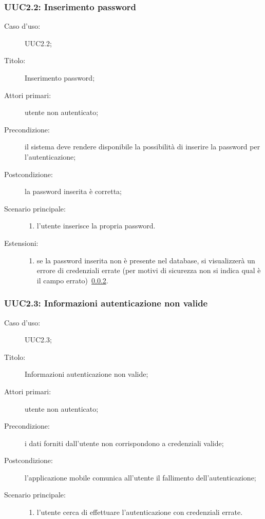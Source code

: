 \documentclass[../../../analisi-dei-requisiti.tex]{subfiles}
\begin{document}
\subsubsection{UUC2.2: Inserimento password}%
\label{subs:UUC2.2}
\begin{description}
  \item[Caso d’uso:] UUC2.2;
  \item[Titolo:] Inserimento password;
  \item[Attori primari:] utente non autenticato;
  \item[Precondizione:] il sistema deve rendere disponibile la possibilità di inserire la password per l'autenticazione;
  \item[Postcondizione:] la password inserita è corretta;
  \item[Scenario principale:]
  \begin{enumerate}
    \item l'utente inserisce la propria password.
  \end{enumerate}
  \item[Estensioni:]
  \begin{enumerate}
    \item se la password inserita non è presente nel database, si visualizzerà un errore di credenziali errate (per motivi di sicurezza non si indica qual è il campo errato)~\ref{subs:UUC2.3}.
  \end{enumerate}
\end{description}



\subsubsection{UUC2.3: Informazioni autenticazione non valide}%
\label{subs:UUC2.3}
\begin{description}
  \item[Caso d’uso:] UUC2.3;
  \item[Titolo:] Informazioni autenticazione non valide;
  \item[Attori primari:] utente non autenticato;
  \item[Precondizione:] i dati forniti dall'utente non corrispondono a credenziali valide;
  \item[Postcondizione:] l'applicazione mobile comunica all'utente il fallimento dell'autenticazione;
  \item[Scenario principale:]
        \begin{enumerate}
          \item l'utente cerca di effettuare l'autenticazione con credenziali errate.
        \end{enumerate}
\end{description}
\end{document}
